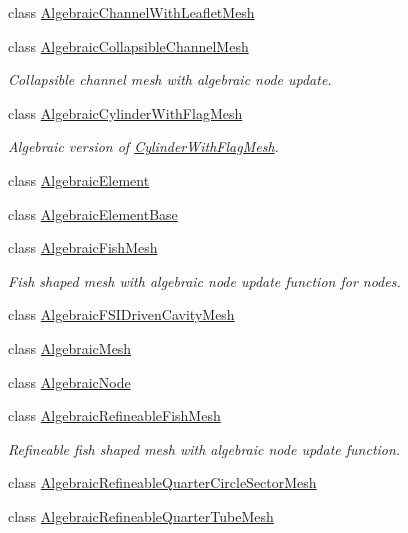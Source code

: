\begin{DoxyCompactItemize}
class \hyperlink{classoomph_1_1AlgebraicChannelWithLeafletMesh}{Algebraic\+Channel\+With\+Leaflet\+Mesh}
\item 
class \hyperlink{classoomph_1_1AlgebraicCollapsibleChannelMesh}{Algebraic\+Collapsible\+Channel\+Mesh}
\begin{DoxyCompactList}\small\item\em Collapsible channel mesh with algebraic node update. \end{DoxyCompactList}\item 
class \hyperlink{classoomph_1_1AlgebraicCylinderWithFlagMesh}{Algebraic\+Cylinder\+With\+Flag\+Mesh}
\begin{DoxyCompactList}\small\item\em Algebraic version of \hyperlink{classoomph_1_1CylinderWithFlagMesh}{Cylinder\+With\+Flag\+Mesh}. \end{DoxyCompactList}\item 
class \hyperlink{classoomph_1_1AlgebraicElement}{Algebraic\+Element}
\item 
class \hyperlink{classoomph_1_1AlgebraicElementBase}{Algebraic\+Element\+Base}
\item 
class \hyperlink{classoomph_1_1AlgebraicFishMesh}{Algebraic\+Fish\+Mesh}
\begin{DoxyCompactList}\small\item\em Fish shaped mesh with algebraic node update function for nodes. \end{DoxyCompactList}\item 
class \hyperlink{classoomph_1_1AlgebraicFSIDrivenCavityMesh}{Algebraic\+F\+S\+I\+Driven\+Cavity\+Mesh}
\item 
class \hyperlink{classoomph_1_1AlgebraicMesh}{Algebraic\+Mesh}
\item 
class \hyperlink{classoomph_1_1AlgebraicNode}{Algebraic\+Node}
\item 
class \hyperlink{classoomph_1_1AlgebraicRefineableFishMesh}{Algebraic\+Refineable\+Fish\+Mesh}
\begin{DoxyCompactList}\small\item\em Refineable fish shaped mesh with algebraic node update function. \end{DoxyCompactList}\item 
class \hyperlink{classoomph_1_1AlgebraicRefineableQuarterCircleSectorMesh}{Algebraic\+Refineable\+Quarter\+Circle\+Sector\+Mesh}
\item 
class \hyperlink{classoomph_1_1AlgebraicRefineableQuarterTubeMesh}{Algebraic\+Refineable\+Quarter\+Tube\+Mesh}

\end{DoxyCompactItemize}
